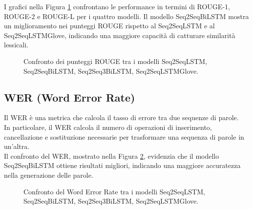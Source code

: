 I grafici nella Figura \ref{fig:rouge_comparison} confrontano le performance in termini di ROUGE-1, ROUGE-2 e ROUGE-L per i quattro modelli. Il modello Seq2SeqBiLSTM mostra un miglioramento nei punteggi ROUGE rispetto al Seq2SeqLSTM e al Seq2SeqLSTMGlove, indicando una maggiore capacit\`a di catturare similarit\`a lessicali.
\begin{figure}[H]
    \centering
    \hfill
    \hfill
    \hfill
    \hfill

    \hfill
    \hfill
    \hfill
    \hfill

    \hfill
    \hfill
    \hfill
    \hfill

    \caption{Confronto dei punteggi ROUGE tra i modelli Seq2SeqLSTM, Seq2SeqBiLSTM, Seq2Seq3BiLSTM, Seq2SeqLSTMGlove.}
    \label{fig:rouge_comparison}
\end{figure}

\subsection{WER (Word Error Rate)}
Il WER \`e una metrica che calcola il tasso di errore tra due sequenze di parole.\\
In particolare, il WER calcola il numero di operazioni di inserimento, cancellazione e sostituzione necessarie per trasformare una sequenza di parole in un'altra.\\

Il confronto del WER, mostrato nella Figura \ref{fig:wer_comparison}, evidenzia che il modello Seq2SeqBiLSTM ottiene risultati migliori, indicando una maggiore accuratezza nella generazione delle parole.

\begin{figure}[H]
    \centering
    \hfill
    \hfill
    \hfill
    
    \caption{Confronto del Word Error Rate tra i modelli Seq2SeqLSTM, Seq2SeqBiLSTM, Seq2Seq3BiLSTM, Seq2SeqLSTMGlove.}
    \label{fig:wer_comparison}
\end{figure}


